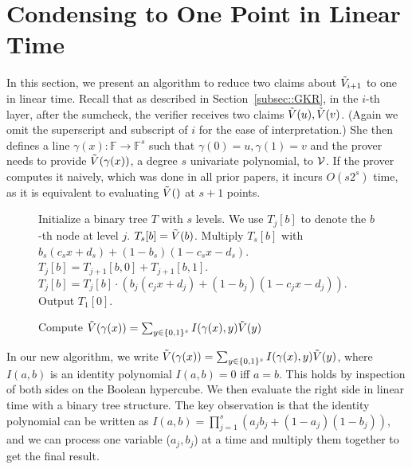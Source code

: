 \newpage

\appendix







\section{Condensing to One Point in Linear Time}\label{app:onepoint}


In this section, we present an algorithm to reduce two claims about $\tilde{V}_{i+1}$ to one in linear time. Recall that as described in Section~\ref{subsec::GKR}, in the $i$-th layer, after the sumcheck, the verifier receives two claims $\tilde{V}(u), \tilde{V}(v)$. (Again we omit the superscript and subscript of $i$ for the ease of interpretation.) She then defines a line $\gamma(x): \mathbb{F}\rightarrow\mathbb{F}^{s}$ such that $\gamma(0) = u, \gamma(1)=v$ and the prover needs to provide $\tilde{V}(\gamma(x))$, a degree $s$ univariate polynomial, to $\mathcal{V}$. If the prover computes it naively, which was done in all prior papers, it incurs $O(s2^{s})$ time, as it is equivalent to evaluating $\tilde{V}()$ at $s+1$ points. 

\begin{figure}[H]
	\begin{algorithm}[H]
		
		\caption{Compute $\tilde{V}(\gamma(x)) = \sum_{y\in\{0,1\}^s}I(\gamma(x), y)\tilde{V}(y)$}\label{alg::comb}
		\begin{algorithmic}[1]
			\State Initialize a binary tree $T$ with $s$ levels. We use $T_j[b]$ to denote the $b$-th node at level $j$.
				\State $T_s[b] = \tilde{V}(b)$.
				\State Multiply $T_s[b]$ with $b_s(c_s x+ d_s)+(1-b_s)(1-c_s x- d_s)$.
			\EndFor
					\State $T_j[b] = T_{j+1}[b,0]+T_{j+1}[b,1]$.
					\State $T_j[b] = T_j[b] \cdot (b_j(c_j x+ d_j)+(1-b_j)(1-c_j x- d_j))$. 
				\EndFor
			\EndFor
			\State Output $T_1[0]$.
		\end{algorithmic}
	\end{algorithm}
\end{figure}


In our new algorithm, we write $\tilde{V}(\gamma(x)) = \sum_{y\in\{0,1\}^s}I(\gamma(x), y)\tilde{V}(y)$, where $I(a,b)$ is an identity polynomial $I(a,b)=0$ iff $a=b$. This holds by inspection of both sides on the Boolean hypercube. We then evaluate the right side in linear time with a binary tree structure. The key observation is that the identity polynomial can be written as $I(a,b) = \prod_{j=1}^s (a_jb_j+(1-a_j)(1-b_j))$, and we can process one variable ($a_j,b_j$) at a time and multiply them together to get the final result. 


